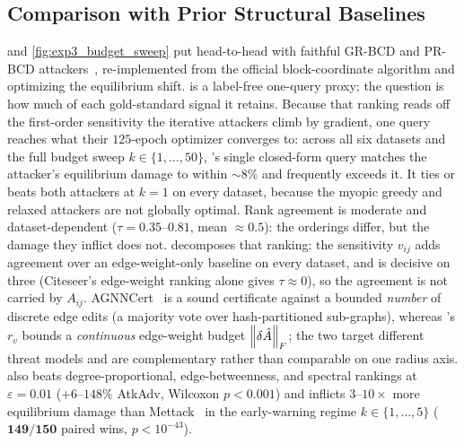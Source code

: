 \subsection{Comparison with Prior Structural Baselines}
\label{app:baselines}
 and \cref{fig:exp3_budget_sweep} put \AEGIS head-to-head with faithful GR-BCD and
PR-BCD attackers~\cite{geisler2021robustness}, re-implemented from the official block-coordinate
algorithm and optimizing the equilibrium shift. \AEGIS is a label-free one-query proxy; the question is
how much of each gold-standard signal it retains. Because that ranking reads off the first-order
sensitivity the iterative attackers climb by gradient, one query reaches what their $125$-epoch optimizer
converges to: across all six datasets and the full budget sweep $k\!\in\!\{1,\ldots,50\}$, \AEGIS's single
closed-form query matches the attacker's equilibrium damage to within ${\sim}8\%$ and frequently exceeds
it. It ties or
beats both attackers at $k{=}1$ on every dataset, because the myopic greedy and relaxed attackers are not
globally optimal. Rank agreement is moderate and dataset-dependent ($\tau{=}0.35$--$0.81$,
mean ${\approx}0.5$): the orderings differ, but the damage they inflict does not. 
decomposes that ranking: the sensitivity $v_{ij}$ adds agreement over an edge-weight-only baseline on
every dataset, and is decisive on three (Citeseer's edge-weight ranking alone gives $\tau{\approx}0$),
so the agreement is not carried by $A_{ij}$. AGNNCert~\cite{li2025agnncert} is a sound certificate against a bounded
\emph{number} of discrete edge edits (a majority vote over hash-partitioned sub-graphs), whereas
\AEGIS's $r_v$ bounds a \emph{continuous} edge-weight budget $\left\|\delta\hat{A}\right\|_F$; the two target
different threat models and are complementary rather than comparable on one radius axis. \AEGIS also
beats degree-proportional, edge-betweenness, and spectral rankings at $\varepsilon{=}0.01$
($+6$--$148\%$ AtkAdv, Wilcoxon $p{<}0.001$) and inflicts $3$--$10\times$ more equilibrium damage than
Mettack~\cite{zugner2019adversarial} in the early-warning regime $k\!\in\!\{1,\ldots,5\}$
($\mathbf{149/150}$ paired wins, $p{<}10^{-43}$).

